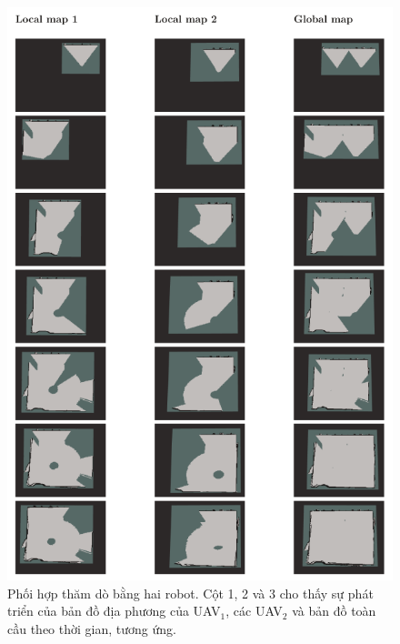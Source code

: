 \documentclass[11pt,openany]{book}
\begin{document}
\begin{figure}[H]
    \centering
    \includegraphics[scale=0.5]{assets/3_14.png}
    \caption{Phối hợp thăm dò bằng hai robot. Cột 1, 2 và 3 cho thấy sự phát triển của bản đồ địa phương của UAV$_1$, các UAV$_2$ và bản đồ toàn cầu theo thời gian, tương ứng.}
    \label{fig:3.14}
\end{figure}
\end{document}
